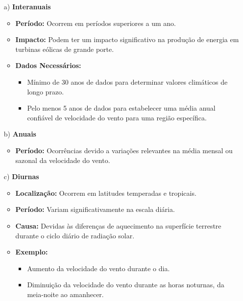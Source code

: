 \begin{itemize}
\item[a)] \textbf{Interanuais}
    \begin{itemize}
        \item \textbf{Período:} Ocorrem em períodos superiores a um ano.
        \item \textbf{Impacto:} Podem ter um impacto significativo na produção de energia em turbinas eólicas de grande porte.
        \item \textbf{Dados Necessários:}
        \begin{itemize}
            \item Mínimo de 30 anos de dados para determinar valores climáticos de longo prazo.
            \item Pelo menos 5 anos de dados para estabelecer uma média anual confiável de velocidade do vento para uma região específica.
        \end{itemize}
    \end{itemize}

    \item[b)] \textbf{Anuais}
    \begin{itemize}
        \item \textbf{Período:} Ocorrências devido a variações relevantes na média mensal ou sazonal da velocidade do vento.
    \end{itemize}

    \item[c)] \textbf{Diurnas}
    \begin{itemize}
        \item \textbf{Localização:} Ocorrem em latitudes temperadas e tropicais.
        \item \textbf{Período:} Variam significativamente na escala diária.
        \item \textbf{Causa:} Devidas às diferenças de aquecimento na superfície terrestre durante o ciclo diário de radiação solar.
        \item \textbf{Exemplo:}
        \begin{itemize}
            \item Aumento da velocidade do vento durante o dia.
            \item Diminuição da velocidade do vento durante as horas noturnas, da meia-noite ao amanhecer.
        \end{itemize}
    \end{itemize}


\end{itemize}
